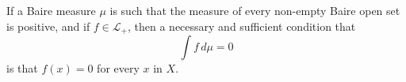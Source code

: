 If a Baire measure $\mu$ is such that the measure of every non-empty Baire open set is positive, and if $f \in \mathcal{L}_+$, then a necessary and sufficient condition that
$$\int f \, d\mu = 0$$
is that $f(x) = 0$ for every $x$ in $X$.
